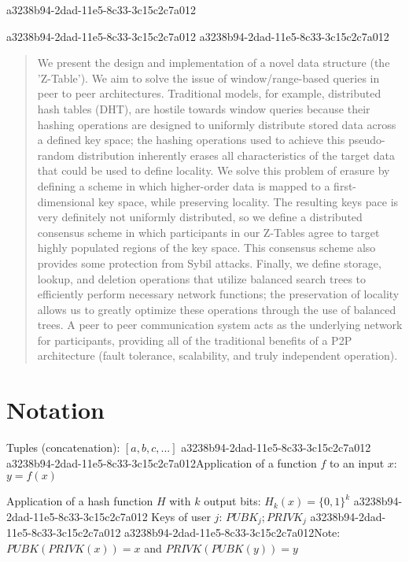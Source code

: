 \documentclass[12pt]{article}
\begin{document}
a3238b94-2dad-11e5-8c33-3c15c2c7a012\maketitle
a3238b94-2dad-11e5-8c33-3c15c2c7a012
a3238b94-2dad-11e5-8c33-3c15c2c7a012\begin{abstract}
We present the design and implementation of a novel data structure (the 'Z-Table'). We aim to solve the issue of window/range-based queries in peer to peer architectures. Traditional models, for example,  distributed hash tables (DHT), are hostile towards window queries because their hashing operations are designed to uniformly distribute stored data across a defined key space; the hashing operations used to achieve this pseudo-random distribution inherently erases all characteristics of the target data that could be used to define locality. We solve this problem of erasure by defining a scheme in which higher-order data is mapped to a first-dimensional key space, while preserving locality. The resulting keys pace is very definitely not uniformly distributed, so we define a distributed consensus scheme in which participants in our Z-Tables agree to target highly populated regions of the key space. This consensus scheme also provides some protection from Sybil attacks. Finally, we define storage, lookup, and deletion operations that utilize balanced search trees to efficiently perform necessary network functions; the preservation of locality allows us to greatly optimize these operations through the use of balanced trees. A peer to peer communication system acts as the underlying network for participants, providing all of the traditional benefits of a P2P architecture (fault tolerance, scalability, and truly independent operation).
\end{abstract}

\section{Notation}

Tuples (concatenation): $[a,b,c,...]$
a3238b94-2dad-11e5-8c33-3c15c2c7a012
a3238b94-2dad-11e5-8c33-3c15c2c7a012Application of a function $f$ to an input $x$: $y=f(x)$

Application of a hash function $H$ with $k$ output bits: $H_{k}(x) = \{0,1\}^k$
a3238b94-2dad-11e5-8c33-3c15c2c7a012
Keys of user $j$: $ PUBK_j; PRIVK_j $
a3238b94-2dad-11e5-8c33-3c15c2c7a012
a3238b94-2dad-11e5-8c33-3c15c2c7a012Note: $PUBK(PRIVK(x)) = x$ and $PRIVK(PUBK(y)) = y$~
\end{document}
